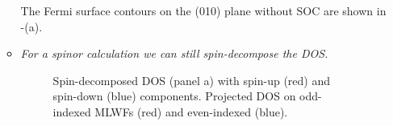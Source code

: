 \begin{itemize}
\begin{itemize}
		The Fermi surface contours on the (010) plane without SOC are shown in -(a).
		\item {\it For a spinor calculation we can still spin-decompose the DOS.}
		\begin{figure}[h!]
		\centering
		\centering
		\caption{Spin-decomposed DOS (panel a) with spin-up (red) and spin-down (blue) components. Projected DOS on odd-indexed MLWFs (red) and even-indexed (blue).}\label{fig17.4}
		\end{figure}
	\end{itemize}
\end{itemize}
